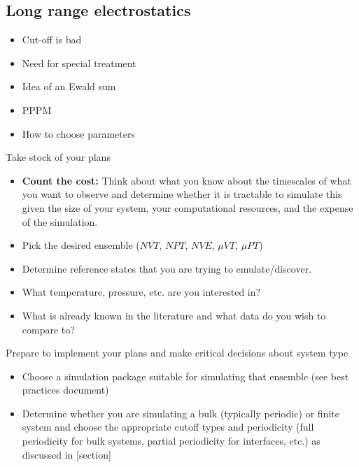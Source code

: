 \documentclass[9pt,bestpractices]{livecoms}
\begin{document}
\subsection{Long range electrostatics}
\begin{itemize}
\item Cut-off is bad
\item Need for special treatment
\item Idea of an Ewald sum
\item PPPM 
\item How to choose parameters
\end{itemize}

\begin{Checklists*}[p!]

\begin{checklist}{Take stock of your plans}

\begin{itemize}
\item \textbf{Count the cost: } Think about what you know about the timescales of what you want to observe and determine whether it is tractable to simulate this given the size of your system, your computational resources, and the expense of the simulation.
\item Pick the desired ensemble ($NVT$, $NPT$, $NVE$, $\mu VT$, $\mu PT$)
\item Determine reference states that you are trying to emulate/discover.
\item What temperature, pressure, etc. are you interested in?
\item What is already known in the literature and what data do you wish to compare to?
\end{itemize}
\end{checklist}

\begin{checklist}{Prepare to implement your plans and make critical decisions about system type}

\begin{itemize}
\item Choose a simulation package suitable for simulating that ensemble (see best practices document) %
\item Determine whether you are simulating a bulk (typically periodic) or finite system and choose the appropriate cutoff types and periodicity (full periodicity for bulk systems, partial periodicity for interfaces, etc.) as discussed in [section] %
\end{itemize}
\end{checklist}


\end{Checklists*}
\end{document}
